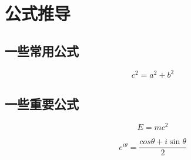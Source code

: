 

\chapter{公式推导}

\section{一些常用公式}
\label{sec:someeq}

$$ c^{2} = a^{2} + b^{2} $$

\section{一些重要公式}
\label{sec:importanteq}

$$ E=mc^{2}$$

$$ e^{i\theta} = \frac{cos\theta + i \sin\theta}{2} $$


